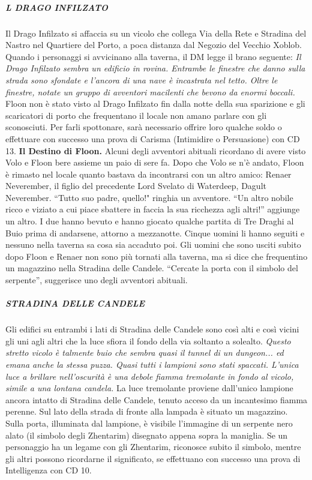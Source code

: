 \documentclass{article}
\begin{document}
                        \subparagraph{L DRAGO INFILZATO}
Il Drago Infilzato si affaccia su un vicolo che collega Via della Rete e Stradina del Nastro nel Quartiere del Porto, a poca distanza dal Negozio del Vecchio Xoblob. Quando i personaggi si avvicinano alla taverna, il DM legge il brano seguente:\newline
\textit{Il Drago Infilzato sembra un edificio in rovina. Entrambe le finestre che danno sulla strada sono sfondate e l'ancora di una nave è incastrata nel tetto. Oltre le finestre, notate un gruppo di avventori macilenti che bevono da enormi boccali.}\newline
Floon non è stato visto al Drago Infilzato fin dalla notte della sua sparizione e gli scaricatori di porto che frequentano il locale non amano parlare con gli sconosciuti. Per farli spottonare, sarà necessario offrire loro qualche soldo o effettuare con successo una prova di Carisma (Intimidire o Persuasione) con CD 13.\newline
\textbf{Il Destino di Floon.} Alcuni degli avventori abituali ricordano di avere visto Volo e Floon bere assieme un paio di sere fa. Dopo che Volo se n'è andato, Floon è rimasto nel locale quanto bastava da incontrarsi con un altro amico: 
Renaer Neverember, il figlio del precedente Lord Svelato di Waterdeep, Dagult Neverember. “Tutto suo padre, quello!" ringhia un avventore. “Un altro nobile ricco e viziato a cui piace sbattere in faccia la sua ricchezza agli altri!” aggiunge un altro. 
I due hanno bevuto e hanno giocato qualche partita di Tre Draghi al Buio prima di andarsene, attorno a mezzanotte. Cinque uomini li hanno seguiti e nessuno nella taverna sa cosa sia accaduto poi. Gli uomini che sono usciti subito dopo Floon e Renaer non sono più tornati alla taverna, ma si dice che frequentino un magazzino nella Stradina delle Candele. “Cercate la porta con il simbolo del serpente”, suggerisce uno degli avventori abituali.

                        \subparagraph{STRADINA DELLE CANDELE}
Gli edifici su entrambi i lati di Stradina delle Candele sono così alti e così vicini gli uni agli altri che la luce sfiora il fondo della via soltanto a solealto.\newline
\textit{Questo stretto vicolo è talmente buio che sembra quasi il tunnel di un dungeon... ed emana anche la stessa puzza. 
Quasi tutti i lampioni sono stati spaccati. L'unica luce a brillare nell'oscurità è una debole fiamma tremolante in fondo al vicolo, simile a una lontana candela.}
\newline
La luce tremolante proviene dall'unico lampione ancora intatto di Stradina delle Candele, tenuto acceso da un incantesimo fiamma perenne. Sul lato della strada di fronte alla lampada è situato un magazzino. Sulla porta, illuminata dal lampione, è visibile l'immagine di un serpente nero alato (il simbolo degli Zhentarim) disegnato appena sopra la maniglia. Se un personaggio ha un legame con gli Zhentarim, riconosce subito il simbolo, mentre gli altri possono ricordarne il significato, se effettuano con successo una prova di Intelligenza con CD 10. 
\end{document}
